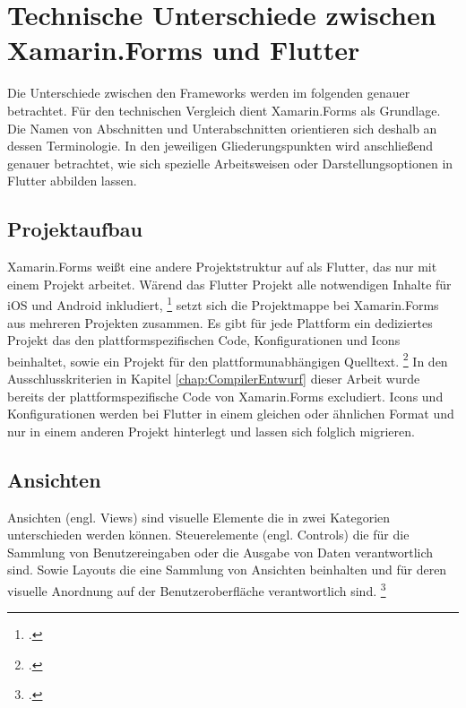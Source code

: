 \chapter{Technische Unterschiede zwischen Xamarin.Forms und Flutter}
\label{chap:CrossPlattformFrameworks}

Die Unterschiede zwischen den Frameworks werden im folgenden genauer betrachtet.  Für den technischen Vergleich dient Xamarin.Forms als Grundlage.  Die Namen von Abschnitten und Unterabschnitten orientieren sich deshalb an dessen Terminologie.  In den jeweiligen Gliederungspunkten wird anschließend genauer betrachtet,  wie sich spezielle Arbeitsweisen oder Darstellungsoptionen in Flutter abbilden lassen. 

\section{Projektaufbau}
Xamarin.Forms weißt eine andere Projektstruktur auf als Flutter,  das nur mit einem Projekt arbeitet.  Wärend das Flutter Projekt alle notwendigen Inhalte für iOS und Android inkludiert, \footcite[Vgl.][S. 113]{Biessek2019} setzt sich die Projektmappe bei Xamarin.Forms aus mehreren Projekten zusammen.  Es gibt für jede Plattform ein dediziertes Projekt das den plattformspezifischen Code,  Konfigurationen und Icons beinhaltet, sowie ein Projekt für den plattformunabhängigen Quelltext.   \footcite[Vgl.][S. 25f.]{Petzold2016} In den Ausschlusskriterien in Kapitel \ref{chap:CompilerEntwurf} dieser Arbeit wurde bereits der plattformspezifische Code von Xamarin.Forms excludiert.  Icons und Konfigurationen werden bei Flutter in einem gleichen oder ähnlichen Format und nur in einem anderen Projekt hinterlegt und lassen sich folglich migrieren. 

\section{Ansichten}
Ansichten (engl. Views) sind visuelle Elemente die in zwei Kategorien unterschieden werden können.  Steuerelemente (engl. Controls) die für die Sammlung von Benutzereingaben oder die Ausgabe von Daten verantwortlich sind.  Sowie Layouts die eine Sammlung von Ansichten beinhalten und für deren visuelle Anordnung auf der Benutzeroberfläche verantwortlich sind.  \footcite[Vgl.][Abgerufen am \today]{Ritscher2020}

